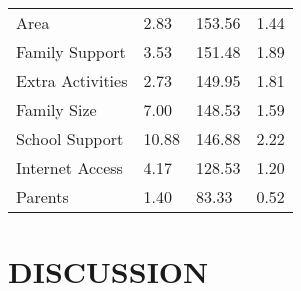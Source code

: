 \documentclass[sigconf]{acmart}
\begin{document}
\begin{table}
\begin{tabular}{llll}
    Area                &  2.83 & 153.56 &  1.44 \\
    Family Support      &  3.53 & 151.48 &  1.89 \\
    Extra Activities    &  2.73 & 149.95 &  1.81 \\
    Family Size         &  7.00 & 148.53 &  1.59 \\
    School Support      & 10.88 & 146.88 &  2.22 \\    
    Internet Access     &  4.17 & 128.53 &  1.20 \\
    Parents             &  1.40 &  83.33 &  0.52 \\
    \bottomrule
  \end{tabular}
\end{table}



\section{DISCUSSION}
\end{document}
